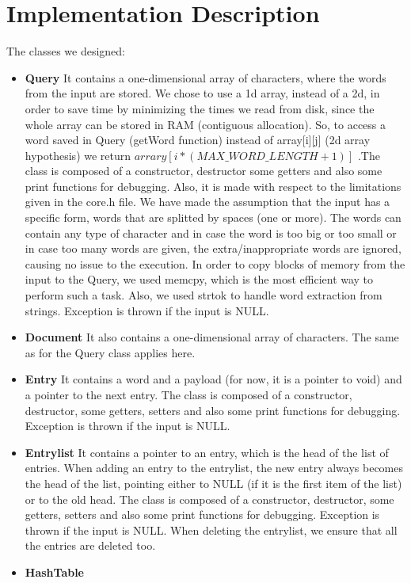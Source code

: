 \documentclass{article}
\begin{document}
\section{Implementation Description}
The classes we designed:
\begin{itemize}
  \item \textbf{Query}
  It contains a one-dimensional array of characters, where the words from the input are stored. We chose to use a 1d array, instead of a 2d, in order to save time by minimizing the times we read from disk, since the whole array can be stored in RAM (contiguous allocation). So, to access a word saved in Query (getWord function) instead of array[i][j] (2d array hypothesis) we return $arrary[i*(MAX\_WORD\_LENGTH + 1)]$ .The class is composed of a constructor, destructor some getters and also some print functions for debugging. Also, it is made with respect to the limitations given in the core.h file. We have made the assumption that the input has a specific form, words that are splitted by spaces (one or more). The words can contain any type of character and in case the word is too big or too small or in case too many words are given, the extra/inappropriate words are ignored, causing no issue to the execution. In order to copy blocks of memory from the input to the Query, we used memcpy, which is the most efficient way to perform such a task. Also, we used strtok to handle word extraction from strings. Exception is thrown if the input is NULL.
  \item \textbf{Document} 
  It also contains a one-dimensional array of characters. The same as for the Query class applies here.
  \item \textbf{Entry}
  It contains a word and a payload (for now, it is a pointer to void) and a pointer to the next entry. The class is composed of a constructor, destructor, some getters, setters and also some print functions for debugging. Exception is thrown if the input is NULL.
  \item \textbf{Entrylist} 
  It contains a pointer to an entry, which is the head of the list of entries. When adding an entry to the entrylist, the new entry always becomes the head of the list, pointing either to NULL (if it is the first item of the list) or to the old head. The class is composed of a constructor, destructor, some getters, setters and also some print functions for debugging. Exception is thrown if the input is NULL.
  When deleting the entrylist, we ensure that all the entries are deleted too.
  \item \textbf{HashTable}

\end{itemize}
\end{document}
